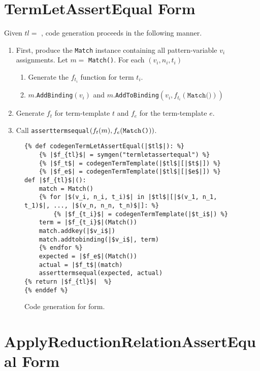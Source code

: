 \section{TermLetAssertEqual Form}

Given $tl=$ \TermLetAssertEqual, code generation proceeds in the following manner.
\begin{enumerate}
	\item First, produce the \texttt{Match} instance containing all pattern-variable $v_i$ assignments. Let $m=$ \texttt{Match()}. For each $(v_i, n_i, t_i)$
	\begin{enumerate}
	\item Generate the $f_{t_i}$ function for term $t_i$.
	\item $m$.\texttt{AddBinding}$(v_i)$ and $m$.\texttt{AddToBinding}$(v_i, f_{t_i}(\texttt{Match()}))$
	\end{enumerate}
\item Generate $f_t$ for term-template $t$ and $f_e$ for the term-template $e$.
\item Call \texttt{asserttermsequal}$(f_t(m), f_e(\texttt{\texttt{Match()}}))$.
\end{enumerate}

\begin{figure}[htb]
\begin{verbatim}
{% def codegenTermLetAssertEqual(|$tl$|): %}
	{% |$f_{tl}$| = symgen("termletassertequal") %}
	{% |$f_t$| = codegenTermTemplate(|$tl$|[|$t$|]) %}
	{% |$f_e$| = codegenTermTemplate(|$tl$|[|$e$|]) %}
def |$f_{tl}$|():
	match = Match()
	{% for |$(v_i, n_i, t_i)$| in |$tl$|[|$(v_1, n_1, t_1)$|, ..., |$(v_n, n_n, t_n)$|]: %}
		{% |$f_{t_i}$| = codegenTermTemplate(|$t_i$|) %}
	term = |$f_{t_i}$|(Match())
	match.addkey(|$v_i$|)
	match.addtobinding(|$v_i$|, term)
	{% endfor %}
	expected = |$f_e$|(Match())
	actual = |$f_t$|(match)
	asserttermsequal(expected, actual)
{% return |$f_{tl}$|  %}
{% enddef %}
\end{verbatim}
\caption{Code generation for \TermLetAssertEqualNoArgs \space form.}
\label{codegen-termlet}
\end{figure}


\section{ApplyReductionRelationAssertEqual Form}

